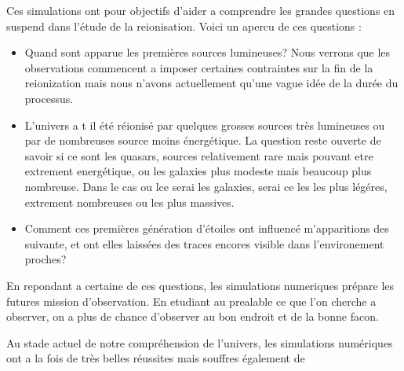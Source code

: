 Ces simulations ont pour objectifs d'aider a comprendre les grandes questions en suspend dans l'étude de la reionisation.
Voici un apercu de ces questions : 

\begin{itemize}
\item Quand sont apparue les premières sources lumineuses?
Nous verrons que les observations commencent a imposer certaines contraintes sur la fin de la reionization mais  nous n'avons actuellement qu'une vague idée de la durée du processus.

\item L'univers a t il été réionisé par quelques grosses sources très lumineuses ou par de nombreuses source moins énergétique.
La question reste ouverte de savoir si ce sont les quasars, sources relativement rare mais pouvant etre extrement energétique, ou les galaxies plus modeste mais beaucoup plus nombreuse.
Dans le cas ou lce serai les galaxies, serai ce les les plus légéres, extrement nombreuses ou les plus massives.

\item Comment ces premières génération d'étoiles ont influencé m'apparitions des suivante, et ont elles laissées des traces encores visible dans l'environement proches?

\end{itemize} 

En repondant a certaine de ces questions, les simulations numeriques prépare les futures mission d'observation.
En etudiant au prealable ce que l'on cherche a  observer, on a plus de chance d'observer au bon endroit et de la bonne facon.


Au stade actuel de notre compréhension de l'univers, les simulations numériques ont a la fois de très belles réussites mais souffres également de 

